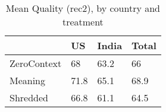 \begin{table}[htbp]
\caption{\label{QualByGroup} Mean Quality (rec2), by country and treatment}\centering\medskip
\begin{tabular}{|l|l|l|l|}\hline  
 & US  & India  & Total  \\ \hline  
ZeroContext & 68 & 63.2 & 66 \\ \hline 
Meaning & 71.8 & 65.1 & 68.9 \\ \hline 
Shredded & 66.8 & 61.1 & 64.5 \\ \hline 
  \end{tabular}
\end{table}
